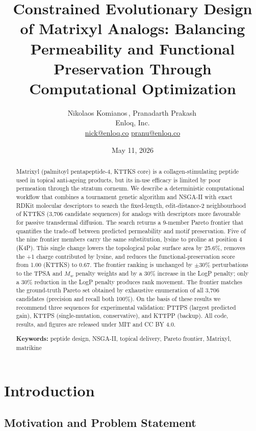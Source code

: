 \documentclass[11pt,letterpaper]{article}
\title{Constrained Evolutionary Design of Matrixyl Analogs: Balancing Permeability and Functional Preservation Through Computational Optimization}
\author{%
  Nikolaos Komianos\,\orcidlink{0009-0005-0717-8340},
  Pranadarth Prakash\,\orcidlink{0009-0001-6716-4478}\\[0.4em]
  \small
  Enloq, Inc.\\[0.3em]
  \href{mailto:nick@enloq.co}{nick@enloq.co} \textbullet{}
  \href{mailto:pranu@enloq.co}{pranu@enloq.co}
}
\date{May 11, 2026}
\begin{document}
\maketitle

\begin{abstract}
Matrixyl (palmitoyl pentapeptide-4, KTTKS core) is a collagen-stimulating peptide used in topical anti-ageing products, but its in-use efficacy is limited by poor permeation through the stratum corneum. We describe a deterministic computational workflow that combines a tournament genetic algorithm and NSGA-II with exact RDKit molecular descriptors to search the fixed-length, edit-distance-2 neighbourhood of KTTKS (3,706 candidate sequences) for analogs with descriptors more favourable for passive transdermal diffusion. The search returns a 9-member Pareto frontier that quantifies the trade-off between predicted permeability and motif preservation. Five of the nine frontier members carry the same substitution, lysine to proline at position 4 (K4P). This single change lowers the topological polar surface area by 25.6\%, removes the +1 charge contributed by lysine, and reduces the functional-preservation score from 1.00 (KTTKS) to 0.67. The frontier ranking is unchanged by $\pm 30\%$ perturbations to the TPSA and $M_w$ penalty weights and by a 30\% increase in the LogP penalty; only a 30\% reduction in the LogP penalty produces rank movement. The frontier matches the ground-truth Pareto set obtained by exhaustive enumeration of all 3,706 candidates (precision and recall both 100\%). On the basis of these results we recommend three sequences for experimental validation: PTTPS (largest predicted gain), KTTPS (single-mutation, conservative), and KTTPP (backup). All code, results, and figures are released under MIT and CC BY 4.0.

\smallskip
\noindent
\textbf{Keywords:} peptide design, NSGA-II, topical delivery, Pareto frontier, Matrixyl, matrikine
\end{abstract}

\newpage
\tableofcontents
\newpage

\section{Introduction}

\subsection{Motivation and Problem Statement}
\end{document}
